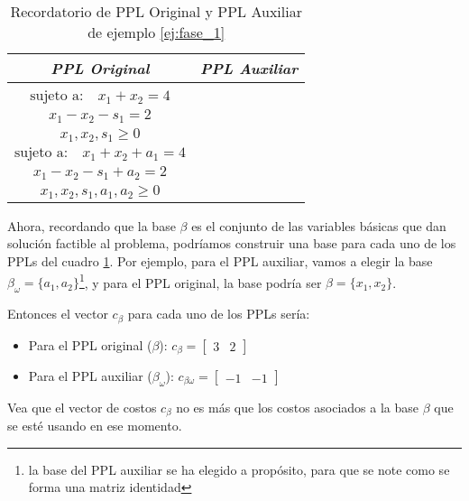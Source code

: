 \begin{table}[htbp]
  \centering
  \renewcommand\cellalign{tl}
  \renewcommand\cellgape{\Gape[4pt]}
  \begin{tabular}{c|c}
  \textit{PPL Original} & \textit{PPL Auxiliar} \\
  \hline
  \makecell[l]{
    \(\text{maximizar} \quad z = 3x_1 + 2x_2\)\\[3pt]
    \(\text{sujeto a:} \quad x_1 + x_2 = 4\)\\
    \hspace{4.5em}\(x_1 - x_2 - s_1 = 2\)\\
    \hspace{4.5em}\(x_1, x_2, s_1 \geq 0\)
  }
  &
  \makecell[l]{
    \(\text{maximizar} \quad -\omega = -a_1 - a_2\)\\[3pt]
    \(\text{sujeto a:} \quad x_1 + x_2 + a_1 = 4\)\\
    \hspace{4.5em}\(x_1 - x_2 - s_1 + a_2 = 2\)\\
    \hspace{4.5em}\(x_1, x_2, s_1, a_1, a_2 \geq 0\)
  }
  \\
  \end{tabular}
  \caption{Recordatorio de PPL Original y PPL Auxiliar de ejemplo \ref{ej:fase_1}}
  \label{tab:comparacion_ppl}
\end{table}

Ahora, recordando que la base \(\beta\) es el conjunto de las variables básicas que dan solución factible al problema, podríamos construir una base para cada uno de los PPLs del cuadro \ref{tab:comparacion_ppl}. Por ejemplo, para el PPL auxiliar, vamos a elegir la base \(\beta_\omega = \{a_1, a_2\}\)\footnote{la base del PPL auxiliar se ha elegido a propósito, para que se note como se forma una matriz identidad}, y para el PPL original, la base podría ser \(\beta = \{x_1, x_2\}\).

Entonces el vector \(c_\beta\) para cada uno de los PPLs sería:
\begin{itemize}
  \item Para el PPL original (\(\beta\)): \(c_\beta = \begin{bmatrix} 3 & 2 \end{bmatrix}\) 
  \item Para el PPL auxiliar (\(\beta_\omega\)): \(c_{\beta\omega} = \begin{bmatrix} -1 & -1 \end{bmatrix}\)
\end{itemize}
\begin{tcolorbox}[remember, title=Aclaración]
  Vea que el vector de costos \(c_\beta\) no es más que los costos asociados a la base \(\beta\) que se esté usando en ese momento.
\end{tcolorbox}

